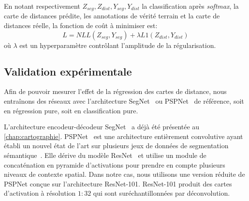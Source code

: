 En notant respectivement $Z_{seg}, Z_{dist}, Y_{seg}, Y_{dist}$ la classification après \textit{softmax}, la carte de distances prédite, les annotations de vérité terrain et la carte de distances réelle, la fonction de coût à minimiser est:
\begin{equation}
L = NLL(Z_{seg}, Y_{seg}) + \lambda L1(Z_{dist}, Y_{dist})
\end{equation}
où $\lambda$ est un hyperparamètre contrôlant l'amplitude de la régularisation.

\subsection{Validation expérimentale}

Afin de pouvoir mesurer l'effet de la régression des cartes de distance, nous entraînons des réseaux avec l'architecture SegNet~\cite{badrinarayanan_segnet_2017} ou PSPNet~\cite{zhao_pyramid_2017} de référence, soit en régression pure, soit en classification pure.

L'architecture encodeur-décodeur SegNet~\cite{badrinarayanan_segnet_2017} a déjà été présentée au \cref{chap:cartographie}. PSPNet~\cite{zhao_pyramid_2017} est une architecture entièrement convolutive ayant établi un nouvel état de l'art sur plusieurs jeux de données de segmentation sémantique~\cite{cordts_cityscapes_2016,everingham_pascal_2014}. Elle dérive du modèle ResNet~\cite{he_deep_2016} et utilise un module de concaténation en pyramide d'activations pour prendre en compte plusieurs niveaux de contexte spatial. Dans notre cas, nous utilisons une version réduite de PSPNet conçue sur l'architecture ResNet-101. ResNet-101 produit des cartes d'activation à résolution $1{:}32$ qui sont suréchantillonnées par déconvolution.

